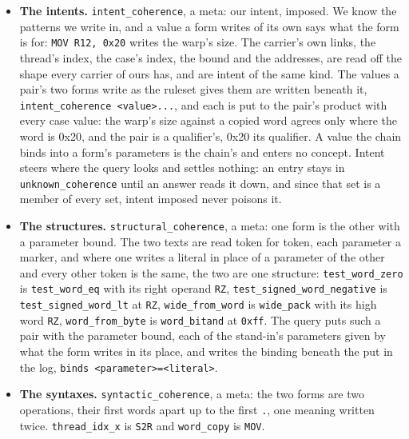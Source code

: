 \begin{itemize}
\item \textbf{The intents.} \texttt{intent\_\allowbreak{}coherence}, a meta: our intent, imposed. We know the patterns we write in, and a value a form writes of its own says what the form is for: \texttt{MOV R12, 0x20} writes the warp's size. The carrier's own links, the thread's index, the case's index, the bound and the addresses, are read off the shape every carrier of ours has, and are intent of the same kind. The values a pair's two forms write as the ruleset gives them are written beneath it, \texttt{intent\_\allowbreak{}coherence <value>.\allowbreak{}.\allowbreak{}.\allowbreak{}}, and each is put to the pair's product with every case value: the warp's size against a copied word agrees only where the word is 0x20, and the pair is a qualifier's, 0x20 its qualifier. A value the chain binds into a form's parameters is the chain's and enters no concept. Intent steers where the query looks and settles nothing: an entry stays in \texttt{unknown\_\allowbreak{}coherence} until an answer reads it down, and since that set is a member of every set, intent imposed never poisons it.
\item \textbf{The structures.} \texttt{structural\_\allowbreak{}coherence}, a meta: one form is the other with a parameter bound. The two texts are read token for token, each parameter a marker, and where one writes a literal in place of a parameter of the other and every other token is the same, the two are one structure: \texttt{test\_\allowbreak{}word\_\allowbreak{}zero} is \texttt{test\_\allowbreak{}word\_\allowbreak{}eq} with its right operand \texttt{RZ}, \texttt{test\_\allowbreak{}signed\_\allowbreak{}word\_\allowbreak{}negative} is \texttt{test\_\allowbreak{}signed\_\allowbreak{}word\_\allowbreak{}lt} at \texttt{RZ}, \texttt{wide\_\allowbreak{}from\_\allowbreak{}word} is \texttt{wide\_\allowbreak{}pack} with its high word \texttt{RZ}, \texttt{word\_\allowbreak{}from\_\allowbreak{}byte} is \texttt{word\_\allowbreak{}bitand} at \texttt{0xff}. The query puts such a pair with the parameter bound, each of the stand-in's parameters given by what the form writes in its place, and writes the binding beneath the put in the log, \texttt{binds <parameter>=<literal>}.
\item \textbf{The syntaxes.} \texttt{syntactic\_\allowbreak{}coherence}, a meta: the two forms are two operations, their first words apart up to the first \texttt{.\allowbreak{}}, one meaning written twice. \texttt{thread\_\allowbreak{}idx\_\allowbreak{}x} is \texttt{S2R} and \texttt{word\_\allowbreak{}copy} is \texttt{MOV}.

\end{itemize}
